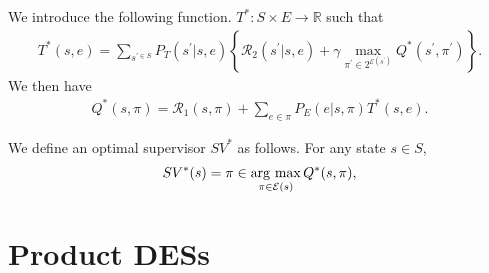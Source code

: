\begin{definition}
  We introduce the following function. $T^{\ast} : S \times E \rightarrow \mathbb{R}$ such that
  \begin{align}
    T^{\ast}(s,e) = \sum_{s^{\prime \in S}} P_T(s^{\prime}|s,e) \left \{ \mathcal{R}_2(s^{\prime}|s,e) + \gamma \max_{\pi^{\prime} \in 2^{\mathcal{E}(s^{\prime})}} Q^{\ast}(s^{\prime}, \pi^{\prime}) \right \}.
  \end{align}
  We then have
  \begin{align}
    Q^{\ast}(s,\pi) = \mathcal{R}_1(s,\pi) + \sum_{e \in \pi}P_E(e|s,\pi) T^{\ast}(s,e).
  \end{align}

\end{definition}

\begin{definition}
We define an optimal supervisor $SV^{\ast}$ as follows. For any state $s \in S$,
\begin{align}
  SV^{\ast}(s) = \pi \in \mathop{\rm arg~max}\limits_{\pi \in \mathcal{E}(s)} Q^{\ast}(s,\pi),
\end{align}
\end{definition}

\section{Product DESs}

